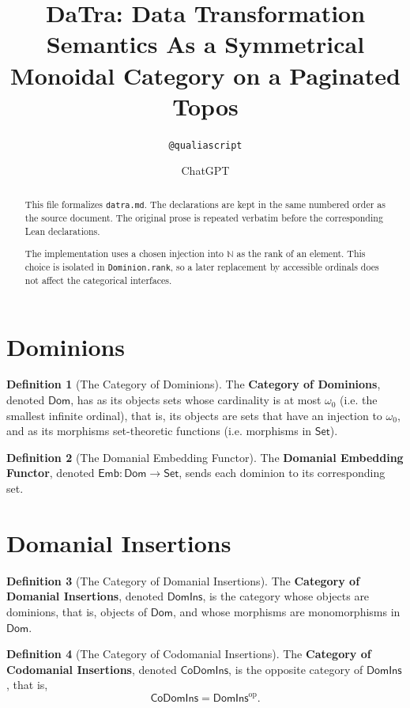 \documentclass[11pt]{article}
\title{DaTra: Data Transformation Semantics As a Symmetrical Monoidal
Category on a Paginated Topos}
\author{\texttt{@qualiascript} \and ChatGPT}
\date{}
\theoremstyle{definition}
\newtheorem{definition}{Definition}[section]
\theoremstyle{plain}
\newcommand{\Set}{\mathsf{Set}}
\begin{document}
\maketitle

\begin{abstract}
This file formalizes \texttt{datra.md}. The declarations are kept in the same
numbered order as the source document. The original prose is repeated
verbatim before the corresponding Lean declarations.

The implementation uses a chosen injection into $\mathbb{N}$ as the rank of an
element. This choice is isolated in \texttt{Dominion.rank}, so a later
replacement by accessible ordinals does not affect the categorical interfaces.
\end{abstract}

\section{Dominions}

\begin{definition}[The Category of Dominions]
The \textbf{Category of Dominions}, denoted $\mathsf{Dom}$, has as its objects
sets whose cardinality is at most $\omega_0$ (i.e. the smallest infinite
ordinal), that is, its objects are sets that have an injection to $\omega_0$,
and as its morphisms set-theoretic functions (i.e. morphisms in $\Set$).
\end{definition}

\begin{definition}[The Domanial Embedding Functor]
The \textbf{Domanial Embedding Functor}, denoted
$\mathsf{Emb} : \mathsf{Dom} \to \Set$, sends each dominion to its
corresponding set.
\end{definition}

\section{Domanial Insertions}

\begin{definition}[The Category of Domanial Insertions]
The \textbf{Category of Domanial Insertions}, denoted $\mathsf{DomIns}$, is
the category whose objects are dominions, that is, objects of $\mathsf{Dom}$,
and whose morphisms are monomorphisms in $\mathsf{Dom}$.
\end{definition}

\begin{definition}[The Category of Codomanial Insertions]
The \textbf{Category of Codomanial Insertions}, denoted $\mathsf{CoDomIns}$,
is the opposite category of $\mathsf{DomIns}$, that is,
\[
  \mathsf{CoDomIns} = \mathsf{DomIns}^{\mathrm{op}}.
\]
\end{definition}
\end{document}
